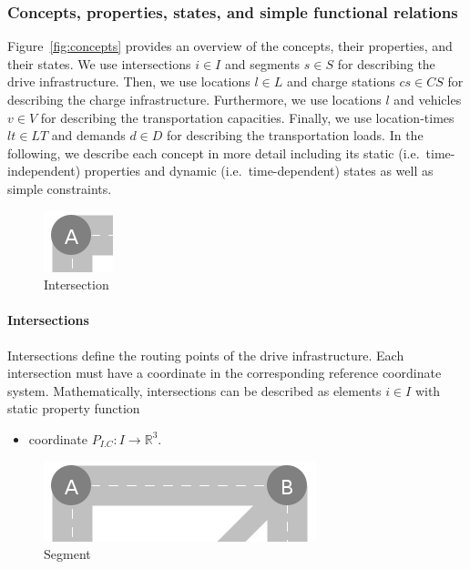 \documentclass{IEEEtran}
\begin{document}
    \subsubsection{Concepts, properties, states, and simple functional relations}
    Figure~\ref{fig:concepts} provides an overview of the concepts, their properties, and their states.
    We use intersections $i \in I$ and segments $s \in S$ for describing the drive infrastructure.
    Then, we use locations $l \in L$ and charge stations $cs \in CS$ for describing the charge infrastructure.
    Furthermore, we use locations $l$ and vehicles $v \in V$ for describing the transportation capacities.
    Finally, we use location-times $lt \in LT$ and demands $d \in D$ for describing the transportation loads.
    In the following, we describe each concept in more detail including its static (i.e.\ time-independent) properties and dynamic (i.e.\ time-dependent) states as well as simple constraints.

    \begin{figure}[htbp]
        \centering
        \includegraphics[scale=0.5]{../../concepts/intersection.png}
        \caption{Intersection}
        \label{fig:intersection}
    \end{figure}
    
    \paragraph{Intersections}
    Intersections define the routing points of the drive infrastructure.
    Each intersection must have a coordinate in the corresponding reference coordinate system.
    Mathematically, intersections can be described as elements $i \in I$ with static property function
    \begin{itemize}
        \item coordinate $P_{I.C}: I \rightarrow \mathbb{R}^3$.
    \end{itemize}

    \begin{figure}[htbp]
        \centering
        \includegraphics[scale=0.5]{../../concepts/segment.png}
        \caption{Segment}
        \label{fig:segment}
    \end{figure}
\end{document}
